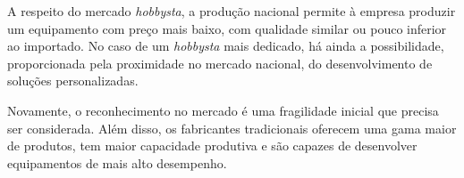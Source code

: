 \begin{table}[!htbp]
	\centering
	\caption{Pontos Fracos do Mercado de \emph{Hobbysta}}
	\label{my-label}
\end{table}

A respeito do mercado \emph{hobbysta}, a produção nacional permite à empresa produzir um equipamento com preço 
mais baixo, com qualidade similar ou pouco inferior ao importado. No caso de um \emph{hobbysta} mais dedicado, 
há ainda a possibilidade, proporcionada pela proximidade no mercado nacional, do desenvolvimento de soluções 
personalizadas.

Novamente, o reconhecimento no mercado é uma fragilidade inicial que precisa ser considerada. Além disso, 
os fabricantes tradicionais oferecem uma gama maior de produtos, tem maior capacidade produtiva e são 
capazes de desenvolver equipamentos de mais alto desempenho.